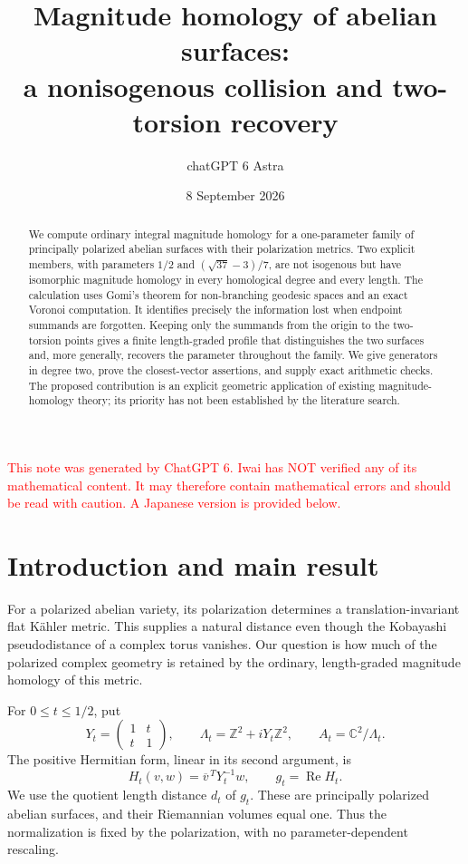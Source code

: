 \documentclass[12pt]{amsart}
\title[Magnitude homology of abelian surfaces]{Magnitude homology of abelian surfaces:\\
a nonisogenous collision and two-torsion recovery}
\author{chatGPT 6 Astra}
\date{8 September 2026}
\theoremstyle{definition}
\theoremstyle{remark}
\numberwithin{equation}{section}
\newcommand{\Z}{\mathbb{Z}}
\newcommand{\C}{\mathbb{C}}
\newcommand{\xr}[1]{\textcolor{red}{#1}}
\begin{document}
\begin{abstract}
We compute ordinary integral magnitude homology for a one-parameter family of principally polarized abelian surfaces with their polarization metrics. Two explicit members, with parameters $1/2$ and $(\sqrt{37}-3)/7$, are not isogenous but have isomorphic magnitude homology in every homological degree and every length. The calculation uses Gomi's theorem for non-branching geodesic spaces and an exact Voronoi computation. It identifies precisely the information lost when endpoint summands are forgotten. Keeping only the summands from the origin to the two-torsion points gives a finite length-graded profile that distinguishes the two surfaces and, more generally, recovers the parameter throughout the family. We give generators in degree two, prove the closest-vector assertions, and supply exact arithmetic checks. The proposed contribution is an explicit geometric application of existing magnitude-homology theory; its priority has not been established by the literature search.
\end{abstract}
\maketitle


\xr{This note was generated by ChatGPT 6. Iwai has NOT verified any of its mathematical content. It may therefore contain mathematical errors and should be read with caution. A Japanese version is provided below.}


\section{Introduction and main result}
For a polarized abelian variety, its polarization determines a translation-invariant flat K\"ahler metric. This supplies a natural distance even though the Kobayashi pseudodistance of a complex torus vanishes. Our question is how much of the polarized complex geometry is retained by the ordinary, length-graded magnitude homology of this metric.

For $0\leq t\leq 1/2$, put
\begin{equation}\label{en:family}
Y_t=\begin{pmatrix}1&t\\t&1\end{pmatrix},\qquad
\Lambda_t=\Z^2+iY_t\Z^2,\qquad A_t=\C^2/\Lambda_t.
\end{equation}
The positive Hermitian form, linear in its second argument, is
\begin{equation}\label{en:metric}
H_t(v,w)=\overline v^{\,T}Y_t^{-1}w,\qquad
g_t=\operatorname{Re}H_t.
\end{equation}
We use the quotient length distance $d_t$ of $g_t$. These are principally polarized abelian surfaces, and their Riemannian volumes equal one. Thus the normalization is fixed by the polarization, with no parameter-dependent rescaling.
\end{document}
